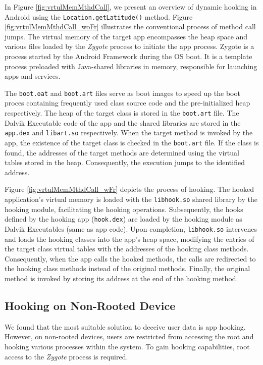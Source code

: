 In Figure \ref{fig:vrtulMemMthdCall}, we present an overview of dynamic hooking in Android using the \texttt{Location.getLatitude()} method. Figure \ref{fig:vrtulMemMthdCall_woFr} illustrates the conventional process of method call jumps. The virtual memory of the target app encompasses the heap space and various files loaded by the \textit{Zygote} process to initiate the app process. Zygote is a process started by the Android Framework during the OS boot. It is a template process preloaded with Java-shared libraries in memory, responsible for launching apps and services. 

The \texttt{boot.oat} and \texttt{boot.art} files serve as boot images to speed up the boot proces containing frequently used class source code and the pre-initialized heap respectively. The heap of the target class is stored in the \texttt{boot.art} file. The Dalvik Executable code of the app and the shared libraries are stored in the \texttt{app.dex} and \texttt{libart.so} respectively. When the target method is invoked by the app, the existence of the target class is checked in the \texttt{boot.art} file. If the class is found, the addresses of the target methods are determined using the virtual tables stored in the heap. Consequently, the execution jumps to the identified address.

Figure \ref{fig:vrtulMemMthdCall_wFr} depicts the process of hooking. The hooked application's virtual memory is loaded with the \texttt{libhook.so} shared library by the hooking module, facilitating the hooking operations. Subsequently, the hooks defined by the hooking app (\texttt{hook.dex}) are loaded by the hooking module as Dalvik Executables (same as app code). Upon completion, \texttt{libhook.so} intervenes and loads the hooking classes into the app's heap space, modifying the entries of the target class virtual tables with the addresses of the hooking class methods. Consequently, when the app calls the hooked methods, the calls are redirected to the hooking class methods instead of the original methods. Finally, the original method is invoked by storing its address at the end of the hooking method.

% 

\subsection{Hooking on Non-Rooted Device}

We found that the most suitable solution to deceive user data is app hooking. However, on non-rooted devices, users are restricted from accessing the root and hooking various processes within the system. To gain hooking capabilities, root access to the \textit{Zygote} process is required. 

